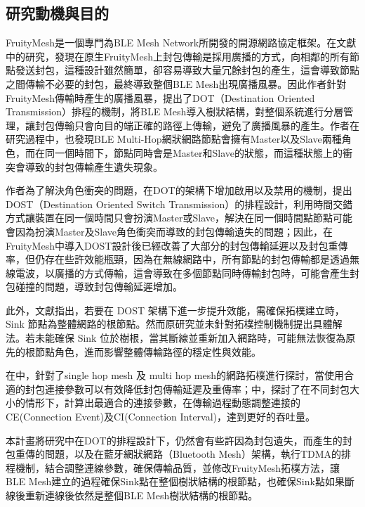\begin{ZhChapter}
	

\section{研究動機與目的}

FruityMesh是一個專門為BLE Mesh Network所開發的開源網路協定框架。在文獻\cite{112TIT00392032}中的研究，發現在原生FruityMesh上封包傳輸是採用廣播的方式，向相鄰的所有節點發送封包，這種設計雖然簡單，卻容易導致大量冗餘封包的產生，這會導致節點之間傳輸不必要的封包，最終導致整個BLE Mesh出現廣播風暴。因此\cite{112TIT00392032}作者針對FruityMesh傳輸時產生的廣播風暴，提出了DOT（Destination Oriented Transmission）排程的機制，將BLE Mesh導入樹狀結構，對整個系統進行分層管理，讓封包傳輸只會向目的端正確的路徑上傳輸，避免了廣播風暴的產生。作者在研究過程中，也發現BLE Multi-Hop網狀網路節點會擁有Master以及Slave兩種角色，而在同一個時間下，節點同時會是Master和Slave的狀態，而這種狀態上的衝突會導致的封包傳輸產生遺失現象。

\cite{112TIT00392032}作者為了解決角色衝突的問題，在DOT的架構下增加啟用以及禁用的機制，提出DOST（Destination Oriented Switch Transmission）的排程設計，利用時間交錯方式讓裝置在同一個時間只會扮演Master或Slave，解決在同一個時間點節點可能會因為扮演Master及Slave角色衝突而導致的封包傳輸遺失的問題；因此，在FruityMesh中導入DOST設計後已經改善了大部分的封包傳輸延遲以及封包重傳率，但仍存在些許效能瓶頸，因為在無線網路中，所有節點的封包傳輸都是透過無線電波，以廣播的方式傳輸，這會導致在多個節點同時傳輸封包時，可能會產生封包碰撞的問題，導致封包傳輸延遲增加。


此外，\cite{112TIT00392032}文獻指出，若要在 DOST 架構下進一步提升效能，需確保拓樸建立時，Sink 節點為整體網路的根節點。然而原研究並未針對拓樸控制機制提出具體解法。若未能確保 Sink 位於樹根，當其斷線並重新加入網路時，可能無法恢復為原先的根節點角色，進而影響整體傳輸路徑的穩定性與效能。

在\cite{112TIT00392032}\cite{110TIT00392037}中，針對了single hop mesh 及 multi hop mesh的網路拓樸進行探討，當使用合適的封包連接參數可以有效降低封包傳輸延遲及重傳率；\cite{109TIT00392031}中，探討了在不同封包大小的情形下，計算出最適合的連接參數，在傳輸過程動態調整連接的CE(Connection Event)及CI(Connection Interval)，達到更好的吞吐量。

本計畫將研究中在DOT的排程設計下，仍然會有些許因為封包遺失，而產生的封包重傳的問題，以及在藍牙網狀網路（Bluetooth Mesh）架構，執行TDMA的排程機制，結合調整連線參數，確保傳輸品質，並修改FruityMesh拓樸方法，讓BLE Mesh建立的過程確保Sink點在整個樹狀結構的根節點，也確保Sink點如果斷線後重新連線後依然是整個BLE Mesh樹狀結構的根節點。


\end{ZhChapter}
